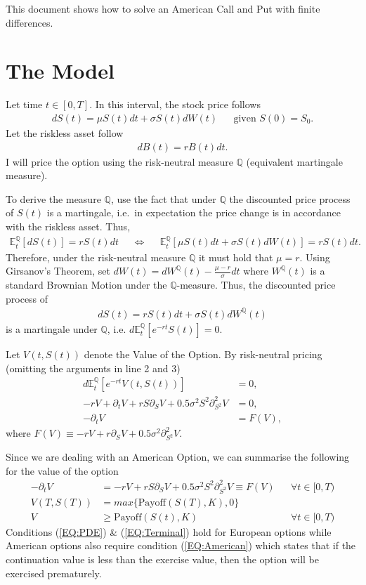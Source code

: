 \documentclass[11pt,a4paper]{article}
\begin{document}
This document shows how to solve an American Call and Put with finite differences.

\section{The Model} \label{Sec:Model}

Let time $t \in [0,T]$. In this interval, the stock price follows
\begin{align*}
dS(t) = \mu S(t) dt + \sigma S(t) dW(t) && \text{given } S(0) = S_0.
\end{align*}
Let the riskless asset follow
\begin{align*}
dB(t) = rB(t) dt.
\end{align*}
I will price the option using the risk-neutral measure $\mathbb{Q}$ (equivalent martingale measure).

To derive the measure $\mathbb{Q}$, use the fact that under $\mathbb{Q}$ the discounted price process of $S(t)$ is a martingale, i.e.\ in expectation the price change is in accordance with the riskless asset. Thus,
\begin{align*}
\mathbb{E}_t^{\mathbb{Q}}[dS(t)]  = rS(t)dt && \Leftrightarrow && \mathbb{E}_t^{\mathbb{Q}}[\mu S(t)dt + \sigma S(t)dW(t)]  = rS(t)dt.
\end{align*}
Therefore, under the risk-neutral measure $\mathbb{Q}$ it must hold that $\mu = r$. Using Girsanov's Theorem, set $dW(t) = dW^{\mathbb{Q}}(t) - \frac{\mu-r}{\sigma}dt$ where $W^{\mathbb{Q}}(t)$ is a standard Brownian Motion under the $\mathbb{Q}$-measure. Thus, the discounted price process of
\begin{align*}
dS(t) = r S(t)dt + \sigma S(t)dW^{\mathbb{Q}}(t)
\end{align*}  
is a martingale under $\mathbb{Q}$, i.e. $d\mathbb{E}_t^{\mathbb{Q}}[e^{-rt} S(t)] = 0$.

Let $V(t,S(t))$ denote the Value of the Option. By risk-neutral pricing (omitting the arguments in line 2 and 3)
\begin{align*}
d\mathbb{E}_t^{\mathbb{Q}}[e^{-rt}V(t,S(t))] & = 0, \\
-rV + \partial_t V + r S \partial_S V + 0.5\sigma^2 S^2 \partial^2_{S^2}V &= 0, \\
- \partial_t V & = F(V),
\end{align*}
where $F(V) \equiv -rV + r \partial_S V + 0.5\sigma^2 \partial^2_{S^2}V$. 

Since we are dealing with an American Option, we can summarise the following for the value of the option
\begin{align}
-\partial_t V &= -rV  +  r S \partial_S V + 0.5\sigma^2 S^2 \partial^2_{S^2}V \equiv F(V) && \forall t \in [0,T) \label{EQ:PDE} \\
V(T,S(T)) & = max\{\text{Payoff}(S(T),K),0\} \label{EQ:Terminal} \\
V & \geq \text{Payoff}(S(t),K) && \forall t \in [0,T)  \label{EQ:American}
\end{align}
Conditions (\ref{EQ:PDE}) \& (\ref{EQ:Terminal}) hold for European options while American options also require condition (\ref{EQ:American}) which states that if the continuation value is less than the exercise value, then the option will be exercised prematurely. 
\end{document}
